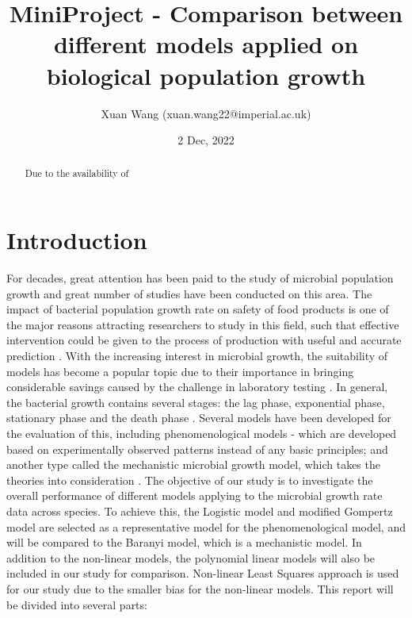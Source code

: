 \documentclass[11pt, oneside]{article}
\title{MiniProject - Comparison between different models applied on biological population growth}
\author{Xuan Wang (xuan.wang22@imperial.ac.uk)}
\date{2 Dec, 2022}
\begin{document}
	\maketitle
	\newpage

	\begin{abstract}
	Due to the availability of 
	\end{abstract}
	\pagebreak

	\section{Introduction}

	For decades, great attention has been paid to the study of microbial population growth and great number of studies have been conducted on this area. The impact of bacterial population growth rate on safety of food products is one of the major reasons attracting researchers to study in this field, such that effective intervention could be given to the process of production with useful and accurate prediction \cite{Nauta}. With the increasing interest in microbial growth, the suitability of models has become a popular topic due to their importance in bringing considerable savings caused by the challenge in laboratory testing \cite{Perni}. 
	\bigbreak
	\noindent In general, the bacterial growth contains several stages: the lag phase, exponential phase, stationary phase and the death phase \cite{Peleg and Corradini}. Several models have been developed for the evaluation of this, including phenomenological models - which are developed based on experimentally observed patterns instead of any basic principles; and another type called the mechanistic microbial growth model, which takes the theories into consideration \cite{Peleg and Corradini}. The objective of our study is to investigate the overall performance of different models applying to the microbial growth rate data across species. To achieve this, the Logistic model and modified Gompertz model are selected as a representative model for the phenomenological model, and will be compared to the Baranyi model, which is a mechanistic model. In addition to the non-linear models, the polynomial linear models will also be included in our study for comparison. Non-linear Least Squares approach is used for our study due to the smaller bias for the non-linear models. 
	\bigbreak
	\noindent This report will be divided into several parts:
\end{document}
